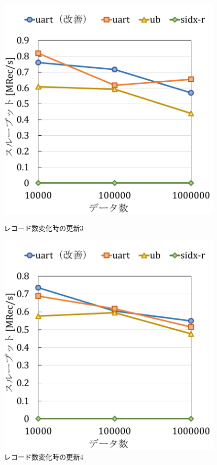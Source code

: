 \begin{figure}[tb]
  \begin{minipage}[c]{0.495\textwidth}
    \centering
    \includegraphics[scale=0.5]{./figures/graph-record-update-8-0.pdf}
    \caption{レコード数変化時の更新3}
    \label{graph:rec-upd-8-0}
  \end{minipage}
  \begin{minipage}[c]{0.495\textwidth}
    \centering
    \includegraphics[scale=0.5]{./figures/graph-record-update-8-0.5.pdf}
    \caption{レコード数変化時の更新4}
    \label{graph:rec-upd-8-0.5}
  \end{minipage}
\end{figure}

